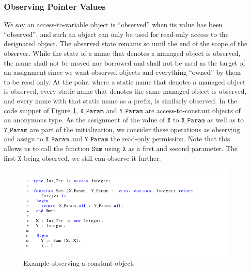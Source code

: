 \documentclass{llncs}
\newcommand\var[1]{\ensuremath{\mathtt{#1}}}
\begin{document}
\subsubsection{Observing Pointer Values}
\label{sec:observing}

We say an access-to-variable object is ``observed'' when its value has been ``observed'', and such an object can only be used for read-only access to the designated object.
The observed state remains so until the end of the scope of the observer. While the state of a name that denotes a managed object is observed, the name shall not be moved nor
borrowed and shall not be used as the target of an assignment since we want observed objects and everything ``owned'' by them to be read only. At the point where a static name
that denotes a managed object is observed, every static name that denotes the same managed object is observed, and every name with that static name as a prefix, is similarly observed. 
In the code snippet of Figure \ref{fig:observe_exp}, \var{X\_Param} and \var{Y\_Param} are access-to-constant objects of an anonymous type. As the assignment of the value of \var{X} to \var{X\_Param}
as well as to \var{Y\_Param} are part of the initialization, we consider these operations as observing and assign to \var{X\_Param} and \var{Y\_Param} the read-only permission. Note that
this allows us to call the function \var{Sum} using \var{X} as a first and second parameter. The first \var{X} being observed, we still can observe it further. 

\begin{figure}[htb!]
\centering
   \includegraphics[width=1.2\columnwidth]{observe_ex1}
   \caption{Example observing a constant object.}
   \label{fig:observe_exp}
\end{figure}
\end{document}
